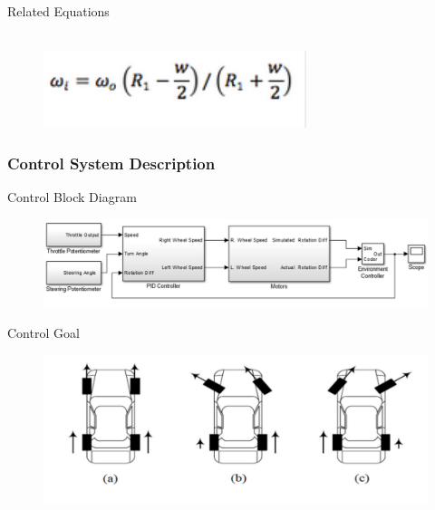 \documentclass{beamer}
\begin{document}
\begin{frame}
\begin{block}{Related Equations}
\begin{figure}
			\\
			\includegraphics[scale=.6]{figures/ackermann5.pdf}
		\end{figure}
	\end{block}								
\end{frame}
\begin{frame}
	\frametitle{Control System Description}
		\begin{block}{Control Block Diagram}
			\begin{figure}
				\centering
				\includegraphics[scale=.4]{figures/controlblock.pdf}
			\end{figure}
		\end{block}
		\begin{block}{Control Goal}
			\begin{figure}
				\centering
				\includegraphics[scale=.4]{figures/controlgoal.pdf}
			\end{figure}
		\end{block}	
\end{frame}
\end{document}
